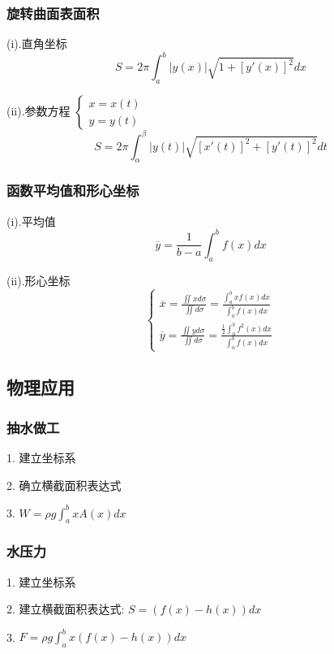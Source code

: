 \subsubsection{旋转曲面表面积}
\begin{theorem}[曲线旋转得到的曲面的表面积]

	(i).直角坐标
	$$S=2\pi\int_{a}^{b}|y(x)|\sqrt{1+[y'(x)]^{2}}dx$$

	(ii).参数方程 $\left\lbrace
		\begin{array}{l}
			x=x(t) \\
			y=y(t)
		\end{array}
		\right. $
	$$S=2\pi\int_{\alpha}^{\beta}|y(t)|\sqrt{[x'(t)]^{2}+[y'(t)]^{2}}dt$$
\end{theorem}
\subsubsection{函数平均值和形心坐标}
\begin{theorem}[平均值和形心坐标]

	(i).平均值
	$$\overline{y}=\frac{1}{b-a}\int_{a}^{b}f(x)dx$$

	(ii).形心坐标
	$$\left\lbrace
		\begin{array}{l}
			\overline{x}=\frac{\iint xd\sigma}{\iint d\sigma}=\frac{\int_{a}^{b}xf(x)dx}{\int_{a}^{b}f(x)dx} \\
			\overline{y}=\frac{\iint yd\sigma}{\iint d\sigma}=\frac{\frac{1}{2}\int_{a}^{b}f^{2}(x)dx}{\int_{a}^{b}f(x)dx}
		\end{array}
		\right. $$
\end{theorem}
\subsection{物理应用}
\subsubsection{抽水做工}
\begin{definition}[抽水做工]

	1. 建立坐标系

	2. 确立横截面积表达式

	3. $W=\rho g\int_{a}^{b}xA(x)dx$
\end{definition}
\subsubsection{水压力}
\begin{definition}[水中受到的压力]

	1. 建立坐标系

	2. 建立横截面积表达式:  $S=(f(x)-h(x))dx$

	3. $F=\rho g\int_{a}^{b}x(f(x)-h(x))dx$
\end{definition}
